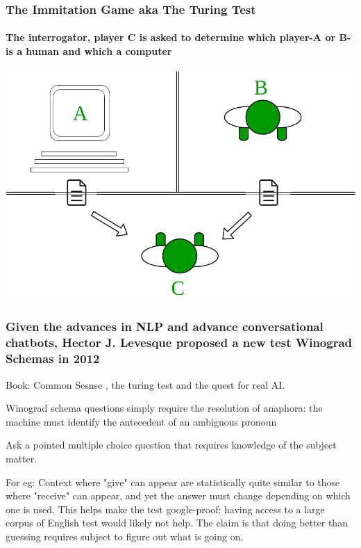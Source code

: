 \documentclass{beamer}
\begin{document}
\begin{frame}
  \frametitle{The Immitation Game aka The Turing Test}
  \framesubtitle{The interrogator, player C is asked to determine which player-A or B-is a human and which a computer}

  \includegraphics[width=\textwidth]{Turing-Test.png}


\end{frame}

\begin{frame}
  \frametitle{Given the advances in NLP and advance conversational chatbots, Hector J. Levesque proposed a new test Winograd Schemas in 2012 }
  Book: Common Sesnse , the turing test and the quest for real AI.

  Winograd schema questions simply require the resolution of anaphora: the machine must identify the antecedent of an ambiguous pronoun

  Ask a pointed multiple choice question that requires knowledge of the subject matter.
  
  For eg: Context where "give" can appear are statistically quite similar to those where "receive" can appear, and yet the answer must change depending on which one is used.
  This helps make the test google-proof: having access to a large corpus of English test would likely not help.
  The claim is that doing better than guessing requires subject to figure out what is going on.



\end{frame}
\end{document}
